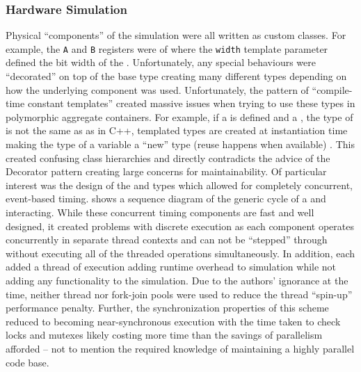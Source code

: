 \subsubsection*{Hardware Simulation}
\label{sec:hc12sim:sec:hardware-simulation}

Physical ``components'' of the simulation were all written as custom classes. For example, the \verb|A| and \verb|B| registers were of  where the \verb|width| template parameter defined the bit width of the . Unfortunately, any special behaviours were ``decorated'' on top of the base type creating many different types depending on how the underlying component was used. Unfortunately, the pattern of ``compile-time constant templates'' created massive issues when trying to use these types in polymorphic aggregate containers. For example, if a  is defined and a , the type of  is not the same as  as in C++, templated types are created at instantiation time making the type of a variable a ``new'' type (reuse happens when available) \cite{cppreference:class-template}. This created confusing class hierarchies and directly contradicts the advice of the Decorator pattern \cite[p.~175]{go4} creating large concerns for maintainability. Of particular interest was the design of the  and  types which allowed for completely concurrent, event-based timing.  shows a sequence diagram of the generic cycle of a  and  interacting. While these concurrent timing components are fast and well designed, it created problems with discrete execution as each component operates concurrently in separate thread contexts and can not be ``stepped'' through without executing all of the threaded operations simultaneously. In addition, each  added a thread of execution adding runtime overhead to simulation while not adding any functionality to the simulation. Due to the authors' ignorance at the time, neither thread nor fork-join pools were used to reduce the thread ``spin-up'' performance penalty. Further, the synchronization properties of this scheme reduced to becoming near-synchronous execution with the time taken to check locks and mutexes likely costing more time than the savings of parallelism afforded -- not to mention the required knowledge of maintaining a highly parallel code base.

